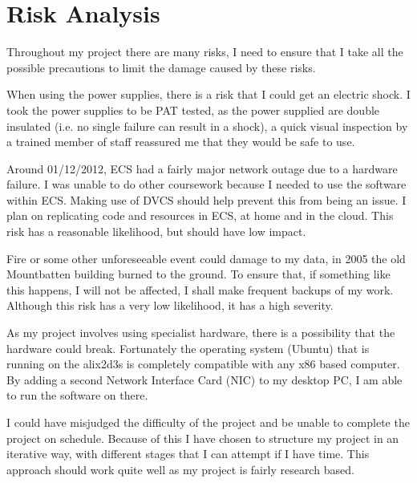 \documentclass[12pt]{report}
\begin{document}
\section{Risk Analysis}
Throughout my project there are many risks, I need to ensure that I take all the
possible precautions to limit the damage caused by these risks.

When using the power supplies, there is a risk that I could get an electric
shock. I took the power supplies to be PAT tested, as the power supplied are
double insulated (i.e. no single failure can result in a shock), a quick visual
inspection by a trained member of staff reassured me that they would be safe to
use. 

Around 01/12/2012, ECS had a fairly major network outage due to a hardware
failure. I was unable to do other coursework because I needed to use the
software within ECS. Making use of DVCS should help prevent this from being an
issue. I plan on replicating code and resources in ECS, at home and in the
cloud. This risk has a reasonable likelihood, but should have low impact. 

Fire or some other unforeseeable event could damage to my data, in 2005 the old
Mountbatten building burned to the ground. To ensure that, if something like
this happens, I will not be affected, I shall make frequent backups of my work.
Although this risk has a very low likelihood, it has a high severity.

As my project involves using specialist hardware, there is a possibility that
the hardware could break. Fortunately the operating system (Ubuntu) that is
running on the alix2d3s is completely compatible with any x86 based computer. By
adding a second Network Interface Card (NIC)  to my desktop PC, I am able to run the software on there. 

I could have misjudged the difficulty of the project and be unable to complete
the project on schedule.  Because of this I have chosen to structure my project
in an iterative way, with different stages that I can attempt if I have time.
This approach should work quite well as my project is fairly research based. 

\pagebreak
\end{document}
